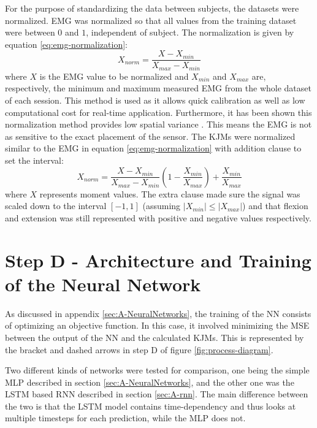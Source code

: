 \documentclass[../main.tex]{subfiles}
\begin{document}
For the purpose of standardizing the data between subjects, the datasets were normalized.
\ac{EMG} was normalized so that all values from the training dataset were between $0$ and $1$, independent of subject.
The normalization is given by equation \ref{eq:emg-normalization}:
\begin{equation}
\label{eq:emg-normalization}
    X_{norm} = \frac{X - X_{min}}{X_{max} - X_{min}}
\end{equation}
where $X$ is the \ac{EMG} value to be normalized and $X_{min}$ and $X_{max}$ are, respectively, the minimum and maximum measured \ac{EMG} from the whole dataset of each session. 
This method is used as it allows quick calibration as well as low computational cost for real-time application.
Furthermore, it has been shown this normalization method provides low spatial variance \cite{Cronin2015}.
This means the \ac{EMG} is not as sensitive to the exact placement of the sensor.
The \acp{KJM} were normalized similar to the \ac{EMG} in equation \ref{eq:emg-normalization} with addition clause to set the interval:
\begin{equation}
\label{eq:moment-normalization}
    X_{norm} = \frac{X - X_{min}}{X_{max} - X_{min}}\left(1 - \frac{X_{min}}{X_{max}}\right) + \frac{X_{min}}{X_{max}}
\end{equation}
where $X$ represents moment values. 
The extra clause made sure the signal was scaled down to the interval $[-1,1]$ (assuming $\left|X_{min}\right| \leq \left|X_{max}\right|$) and that flexion and extension was still represented with positive and negative values respectively.

\section{Step D - Architecture and Training of the Neural Network}
As discussed in appendix \ref{sec:A-NeuralNetworks}, the training of the \ac{NN} consists of optimizing an objective function.
In this case, it involved minimizing the \ac{MSE} between the output of the \ac{NN} and the calculated \acp{KJM}.
This is represented by the bracket and dashed arrows in step D of figure \ref{fig:process-diagram}.

Two different kinds of networks were tested for comparison, one being the simple \ac{MLP} described in section \ref{sec:A-NeuralNetworks}, and the other one was the \ac{LSTM} based \ac{RNN} described in section \ref{sec:A-rnn}.
The main difference between the two is that the \ac{LSTM} model contains time-dependency and thus looks at multiple timesteps for each prediction, while the \ac{MLP} does not.
\end{document}
